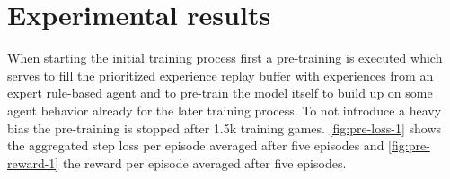 \section{Experimental results} \label{experimental_results}


When starting the initial training process first a pre-training is executed which serves to fill the prioritized experience replay buffer with experiences from an expert rule-based agent and to pre-train the model itself to build up on some agent behavior already for the later training process. To not introduce a heavy bias the pre-training is stopped after 1.5k training games. \autoref{fig:pre-loss-1} shows the aggregated step loss per episode averaged after five episodes and \autoref{fig:pre-reward-1} the reward per episode averaged after five episodes.


